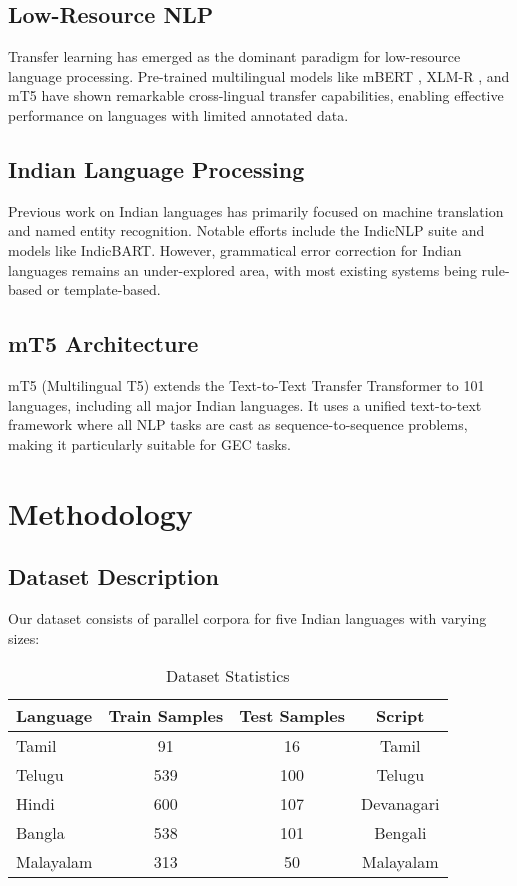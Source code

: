 \documentclass[12pt,a4paper]{article}
\begin{document}
\subsection{Low-Resource NLP}
Transfer learning has emerged as the dominant paradigm for low-resource language processing. Pre-trained multilingual models like mBERT \cite{devlin2019bert}, XLM-R \cite{conneau2020unsupervised}, and mT5 \cite{xue2021mt5} have shown remarkable cross-lingual transfer capabilities, enabling effective performance on languages with limited annotated data.

\subsection{Indian Language Processing}
Previous work on Indian languages has primarily focused on machine translation and named entity recognition. Notable efforts include the IndicNLP suite and models like IndicBART. However, grammatical error correction for Indian languages remains an under-explored area, with most existing systems being rule-based or template-based.

\subsection{mT5 Architecture}
mT5 (Multilingual T5) extends the Text-to-Text Transfer Transformer to 101 languages, including all major Indian languages. It uses a unified text-to-text framework where all NLP tasks are cast as sequence-to-sequence problems, making it particularly suitable for GEC tasks.

\newpage

\section{Methodology}

\subsection{Dataset Description}
Our dataset consists of parallel corpora for five Indian languages with varying sizes:

\begin{table}[H]
\centering
\caption{Dataset Statistics}
\begin{tabular}{lccc}
\toprule
\textbf{Language} & \textbf{Train Samples} & \textbf{Test Samples} & \textbf{Script} \\
\midrule
Tamil & 91 & 16 & Tamil \\
Telugu & 539 & 100 & Telugu \\
Hindi & 600 & 107 & Devanagari \\
Bangla & 538 & 101 & Bengali \\
Malayalam & 313 & 50 & Malayalam \\
\bottomrule
\end{tabular}
\end{table}
\end{document}
